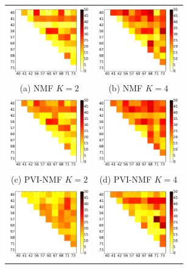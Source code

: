 \begin{figure}[H]
\begin{center}
\begin{tabular}{cc}
    \includegraphics[width=35mm]{Chapters/05_Separation_Known/figures/PEASSplots/OPS/NMF2.png} & \includegraphics[width=35mm]{Chapters/05_Separation_Known/figures/PEASSplots/OPS/NMF4.png} \\
    (a) NMF $K=2$ & (b) NMF $K=4$ \\[6pt]
        \includegraphics[width=35mm]{Chapters/05_Separation_Known/figures/PEASSplots/OPS/NMFWARP2.png} & \includegraphics[width=35mm]{Chapters/05_Separation_Known/figures/PEASSplots/OPS/NMFWARP4.png} \\
    (c) PVI-NMF $K=2$ & (d) PVI-NMF $K=4$ \\[6pt]
         \includegraphics[width=35mm]{Chapters/05_Separation_Known/figures/PEASSplots/OPS/NTF2.png} & \includegraphics[width=35mm]{Chapters/05_Separation_Known/figures/PEASSplots/OPS/NTF4.png} \\

\end{tabular}
\end{center}
\end{figure}
